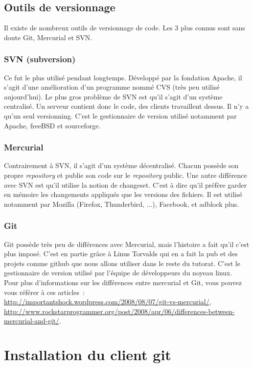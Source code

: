 \documentclass[a4paper,10pt]{report}
\begin{document}
    \subsection{Outils de versionnage}
Il existe de nombreux outils de versionnage de code. Les 3 plus connus sont sans doute Git, Mercurial et SVN.
      \subsubsection{SVN (subversion)}
Ce fut le plus utilisé pendant longtemps. Développé par la fondation Apache, il s'agit d'une amélioration d'un programme nommé CVS (très peu utilisé aujourd'hui). Le plus gros problème de SVN est qu'il s'agit d'un système centralisé. Un serveur contient donc le code, des clients travaillent dessus. Il n'y a qu'un seul versionning. C'est le gestionnaire de version utilis\'e notamment par Apache, freeBSD et sourceforge.
      \subsubsection{Mercurial}
Contrairement à SVN, il s'agit d'un système décentralisé. Chacun possède son propre \emph{repository} et publie son code sur le \emph{repository} public. Une autre différence avec SVN est qu'il utilise la notion de changeset. C'est à dire qu'il préfère garder en mémoire les changements appliqués que les versions des fichiers. Il est utilis\'e notamment par Mozilla (Firefox, Thunderbird, ...), Facebook, et adblock plus.
      \subsubsection{Git}
Git possède très peu de différences avec Mercurial, mais l'histoire a fait qu'il c'est plus imposé.
C'est en partie grâce à Linus Torvalds qui en a fait la pub et des projets comme github que nous allons utiliser dans le reste du tutorat.
C'est le gestionnaire de version utilis\'e par l'\'equipe de d\'eveloppeurs du noyeau linux.\\

Pour plus d'informations sur les différences entre mercurial et Git, vous pouvez vous référer à ces articles~: \url{http://importantshock.wordpress.com/2008/08/07/git-vs-mercurial/}, \url{http://www.rockstarprogrammer.org/post/2008/apr/06/differences-between-mercurial-and-git/}.
  \section{Installation du client git}
\end{document}
